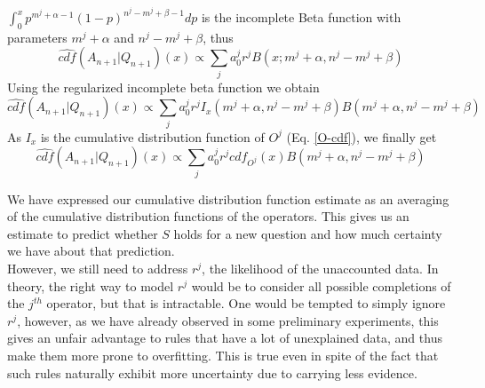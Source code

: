 \documentclass[runningheads]{llncs}
\begin{document}
$\displaystyle\int_0^x p^{m^j+\alpha - 1}(1-p)^{n^j-m^j+\beta - 1} dp$
is the incomplete Beta function with parameters $m^j+\alpha$ and
$n^j-m^j+\beta$, thus
\begin{equation}
  \label{betaconsol-3}
  \hat{cdf}(A_{n+1}|Q_{n+1})(x) \propto \sum_j a_0^j r^j
  B(x; m^j+\alpha, n^j-m^j+\beta)
\end{equation}
Using the regularized incomplete beta function we obtain
\begin{equation}
  \label{betaconsol-4}
  \hat{cdf}(A_{n+1}|Q_{n+1})(x) \propto \sum_j a_0^j r^j
  I_x(m^j+\alpha, n^j-m^j+\beta)
  B(m^j+\alpha, n^j-m^j+\beta)
\end{equation}
As $I_x$ is the cumulative distribution function of $O^j$
(Eq. \ref{O-cdf}), we finally get
\begin{equation}
  \label{betaconsol-final}
  \hat{cdf}(A_{n+1}|Q_{n+1})(x) \propto \sum_j a_0^j r^j cdf_{O^j}(x)
  B(m^j+\alpha, n^j-m^j+\beta)
\end{equation}

We have expressed our cumulative distribution function estimate as an
averaging of the cumulative distribution functions of the
operators. This gives us an estimate to predict whether $S$ holds for
a new question and how much certainty we have about that prediction.\\

However, we still need to address $r^j$, the likelihood of the
unaccounted data. In theory, the right way to model $r^j$ would be to
consider all possible completions of the $j^{th}$ operator, but that
is intractable. One would be tempted to simply ignore $r^j$, however,
as we have already observed in some preliminary experiments, this
gives an unfair advantage to rules that have a lot of unexplained
data, and thus make them more prone to overfitting. This is true even
in spite of the fact that such rules naturally exhibit more
uncertainty due to carrying less evidence.
\end{document}
